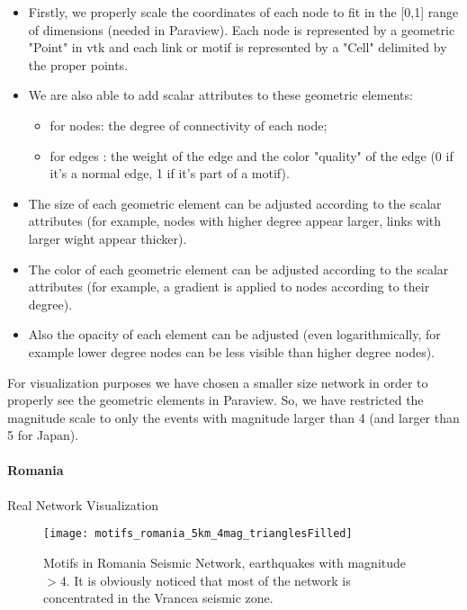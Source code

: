 \begin{itemize}

	\item Firstly, we properly scale the coordinates of each node to fit in the [0,1] range of dimensions (needed in Paraview). Each node is represented by a geometric "Point" in vtk and each link or motif is represented by a "Cell" delimited by the proper points.
	
	\item We are also able to add scalar attributes to these geometric elements:
	\begin{itemize}
		\item for nodes: the degree of connectivity of each node;
		\item for edges : the weight of the edge and the color "quality" of the edge (0 if it's a normal edge, 1 if it's part of a motif).
	\end{itemize}
	
	\item The size of each geometric element can be adjusted according to the scalar attributes (for example, nodes with higher degree appear larger, links with larger wight appear thicker).
	
	\item The color of each geometric element can be adjusted according to the scalar attributes (for example, a gradient is applied to nodes according to their degree).
	
	\item Also the opacity of each element can be adjusted (even logarithmically, for example lower degree nodes can be less visible than higher degree nodes).
 
\end{itemize}
For visualization purposes we have chosen a smaller size network in order to properly see the geometric elements in Paraview. So, we have restricted the magnitude scale to only the events with magnitude larger than 4 (and larger than 5 for Japan).
\newpage

\paragraph{Romania} Real Network Visualization 

\begin{figure}[!h]
  \centering
  \texttt{[image: motifs\_romania\_5km\_4mag\_trianglesFilled]}
  \caption{Motifs in Romania Seismic Network, earthquakes with magnitude $>4$. It is obviously noticed that most of the network is concentrated in the Vrancea seismic zone.}
  \label{fig:motifRomania}
\end{figure}


